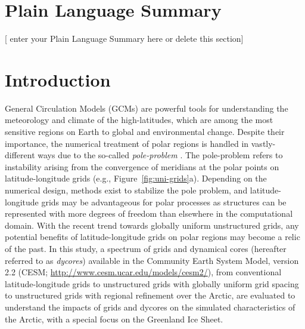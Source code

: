 \documentclass[draft]{agujournal2019}
\begin{document}
\section*{Plain Language Summary}
[ enter your Plain Language Summary here or delete this section]


%
%

\section{Introduction}

General Circulation Models (GCMs) are powerful tools for understanding the meteorology and climate of the high-latitudes, which are among the most sensitive regions on Earth to global and environmental change. Despite their importance, the numerical treatment of polar regions is handled in vastly-different ways due to the so-called \textit{pole-problem} \cite{W2007JMSJ}. The pole-problem refers to instability arising from the convergence of meridians at the polar points on latitude-longitude grids (e.g., Figure~\ref{fig:uni-grids}a). Depending on the numerical design, methods exist to stabilize the pole problem, and latitude-longitude grids may be advantageous for polar processes as structures can be represented with more degrees of freedom than elsewhere in the computational domain. With the recent trend towards globally uniform unstructured grids, any potential benefits of latitude-longitude grids on polar regions may become a relic of the past. In this study, a spectrum of grids and dynamical cores (hereafter referred to as \textit{dycores}) available in the Community Earth System Model, version 2.2 (CESM; \url{http://www.cesm.ucar.edu/models/cesm2/}), from conventional latitude-longitude grids to unstructured grids with globally uniform grid spacing to unstructured grids with regional refinement over the Arctic, are evaluated to understand the impacts of grids and dycores on the simulated characteristics of the Arctic, with a special focus on the Greenland Ice Sheet.
\end{document}
